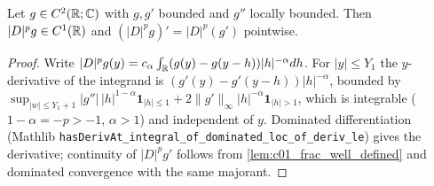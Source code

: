 \begin{lemma}
  \label{lem:c04_frac_derivative}
  Let $g\in C^2(\mathbb{R};\mathbb{C})$ with $g,g'$ bounded and $g''$ locally bounded. Then $|D|^pg\in C^1(\mathbb{R})$ and
  $(|D|^pg)'=|D|^p(g')$ pointwise.
\end{lemma}
\begin{proof}
  Write $|D|^pg(y)=c_\alpha\int_{\mathbb{R}}(g(y)-g(y-h))|h|^{-\alpha}dh$. For $|y|\le Y_1$ the $y$-derivative of the
  integrand is $(g'(y)-g'(y-h))|h|^{-\alpha}$, bounded by
  $\sup_{|w|\le Y_1+1}|g''|\,|h|^{1-\alpha}\mathbf 1_{|h|\le1}+2\|g'\|_\infty|h|^{-\alpha}\mathbf 1_{|h|>1}$, which is
  integrable ($1-\alpha=-p>-1$, $\alpha>1$) and independent of $y$. Dominated differentiation
  (Mathlib \texttt{hasDerivAt\_integral\_of\_dominated\_loc\_of\_deriv\_le}) gives the derivative; continuity of
  $|D|^pg'$ follows from \cref{lem:c01_frac_well_defined} and dominated convergence with the same majorant.
\end{proof}

